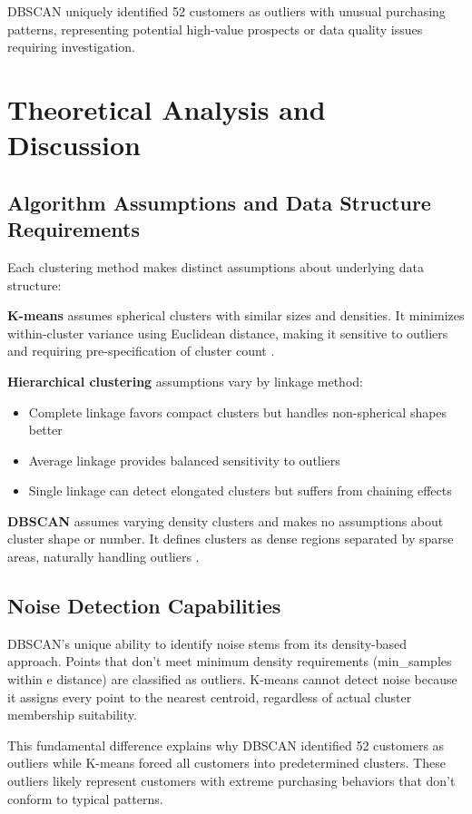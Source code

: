 \documentclass[conference]{IEEEtran}
\begin{document}
DBSCAN uniquely identified 52 customers as outliers with unusual purchasing patterns, representing potential high-value prospects or data quality issues requiring investigation.

\section{Theoretical Analysis and Discussion}

\subsection{Algorithm Assumptions and Data Structure Requirements}

Each clustering method makes distinct assumptions about underlying data structure:

\textbf{K-means} assumes spherical clusters with similar sizes and densities. It minimizes within-cluster variance using Euclidean distance, making it sensitive to outliers and requiring pre-specification of cluster count \cite{b4}.

\textbf{Hierarchical clustering} assumptions vary by linkage method:
\begin{itemize}
\item Complete linkage favors compact clusters but handles non-spherical shapes better
\item Average linkage provides balanced sensitivity to outliers
\item Single linkage can detect elongated clusters but suffers from chaining effects
\end{itemize}

\textbf{DBSCAN} assumes varying density clusters and makes no assumptions about cluster shape or number. It defines clusters as dense regions separated by sparse areas, naturally handling outliers \cite{b5}.

\subsection{Noise Detection Capabilities}

DBSCAN's unique ability to identify noise stems from its density-based approach. Points that don't meet minimum density requirements (min\_samples within e distance) are classified as outliers. K-means cannot detect noise because it assigns every point to the nearest centroid, regardless of actual cluster membership suitability.

This fundamental difference explains why DBSCAN identified 52 customers as outliers while K-means forced all customers into predetermined clusters. These outliers likely represent customers with extreme purchasing behaviors that don't conform to typical patterns.
\end{document}
